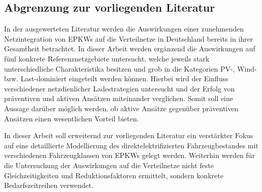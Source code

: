 \subsection{Abgrenzung zur vorliegenden Literatur}

In der ausgewerteten Literatur werden die Auswirkungen einer zunehmenden Netzintegration von \glspl{EPKW} auf die Verteilnetze in Deutschland bereits in ihrer Gesamtheit betrachtet.
In dieser Arbeit werden ergänzend die Auswirkungen auf fünf konkrete Referenznetzgebiete untersucht, welche jeweils stark unterschiedliche Charakteristika besitzen und grob in die Kategorien \gls{PV}-, Wind- bzw. Last-dominiert eingeteilt werden können.
Hierbei wird der Einfluss verschiedener netzdienlicher Ladestrategien untersucht und der Erfolg von präventiven und aktiven Ansätzen miteinander verglichen.
Somit soll eine Aussage darüber möglich werden, ob aktive Ansätze gegenüber präventiven Ansätzen einen wesentlichen Vorteil bieten.

In dieser Arbeit soll erweiternd zur vorliegenden Literatur ein verstärkter Fokus auf eine detaillierte Modellierung des direktelektrifizierten Fahrzeugbestandes mit verschiedenen Fahrzeugklassen von \glspl{EPKW} gelegt werden.
Weiterhin werden für die Untersuchung der Auswirkungen auf die Verteilnetze nicht feste Gleichzeitigkeiten und Reduktionsfaktoren ermittelt, sondern konkrete Bedarfszeitreihen verwendet.


\clearpage
